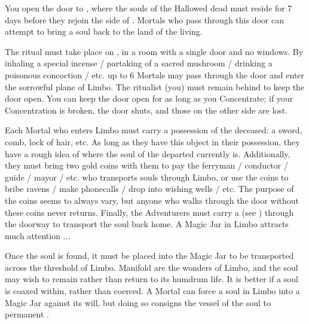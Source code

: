 


\newpage


\OCCULT[
  Name=Katabasis,
  Link=occultism-katabasis,
  Pips=20,
  Time=Days
]


You open the door to , where the souls of the Hallowed dead must reside for 7 days before they rejoin the side of \TheAuthority. Mortals who pass through this door can attempt to bring a soul back to the land of the living.

The ritual must take place on , in a room with a single door and no windows. By inhaling a special incense / partaking of a sacred mushroom / drinking a poisonous concoction / etc. up to 6 Mortals may pass through the door and enter the sorrowful plane of Limbo. The ritualist (you) must remain behind to keep the door open. You can keep the door open for as long as you Concentrate; if your Concentration is broken, the door shuts, and those on the other side are lost.

Each Mortal who enters Limbo must carry a possession of the deceased: a sword, comb, lock of hair, etc. As long as they have this object in their possession, they have a rough idea of where the soul of the departed currently is. Additionally, they must bring two gold coins with them to pay the ferryman / conductor / guide / mayor / etc. who transports souls through Limbo, or use the coins to bribe ravens / make phonecalls / drop into wishing wells / etc.  The purpose of the coins seems to always vary, but anyone who walks through the door without these coins never returns. Finally, the Adventurers must carry a  (see ) through the doorway to transport the soul back home. A Magic Jar in Limbo attracts much attention ...

Once the soul is found, it must be placed into the Magic Jar to be transported across the threshold of Limbo. Manifold are the wonders of Limbo, and the soul may wish to remain rather than return to its humdrum life. It is better if a soul is coaxed within, rather than coerced. A Mortal can force a soul in Limbo into a Magic Jar against its will, but doing so consigns the vessel of the soul to permanent .

